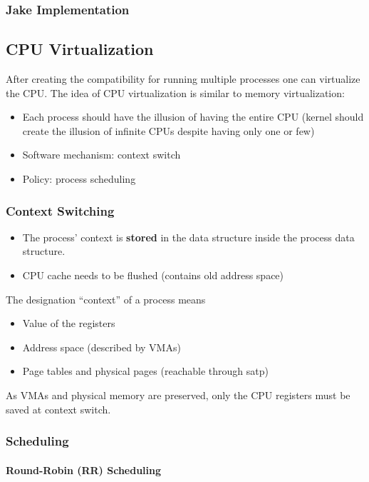 \subsubsection{Jake Implementation}

\subsection{CPU Virtualization}
After creating the compatibility for running multiple processes one can virtualize the CPU. The idea of CPU virtualization is similar to memory virtualization:
\begin{itemize}
    \item Each process should have the illusion of having the entire CPU (kernel should create the illusion of infinite CPUs despite having only one or few)
    \item Software mechanism: context switch
    \item Policy: process scheduling
\end{itemize}
\subsubsection{Context Switching}
\begin{itemize}
    \item The process' context is \textbf{stored} in the  data structure inside the process data structure.
    \item CPU cache needs to be flushed (contains old address space)
\end{itemize}

\newpar{}

The designation ``context'' of a process means
\begin{itemize}
    \item Value of the registers
    \item Address space (described by VMAs)
    \item Page tables and physical pages (reachable through satp)
\end{itemize}
As VMAs and physical memory are preserved, only the CPU registers must be saved at context switch.

\subsubsection{Scheduling}
\paragraph{Round-Robin (RR) Scheduling}

